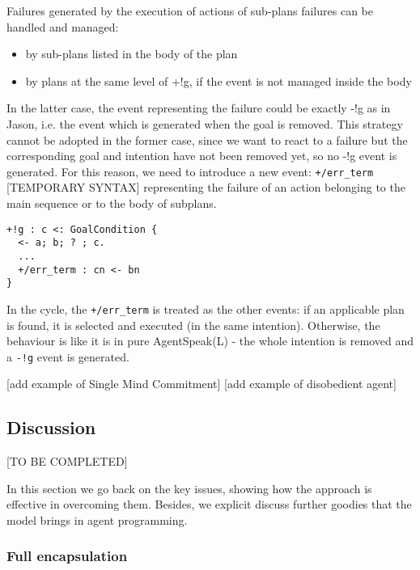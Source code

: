 
Failures generated by the execution of actions of sub-plans failures can be handled and managed:

\begin{itemize}
\item by sub-plans listed in the body of the plan
\item by plans at the same level of +!g, if the event is not managed inside the body
\end{itemize}

\noindent In the latter case, the event representing the failure could be exactly -!g as in Jason, i.e. the event which is generated when the goal is removed.
%
This strategy cannot be adopted in the former case, since we want to react to a failure but the corresponding goal and intention have not been removed yet, so no -!g event is generated. For this reason, we need to introduce a new event:  \texttt{+/err\_term}  [TEMPORARY SYNTAX]  representing the failure of an action belonging to the main sequence or to the body of subplans.  

{\small
\begin{verbatim}
+!g : c <: GoalCondition {
  <- a; b; ? ; c. 
  ...
  +/err_term : cn <- bn
}
\end{verbatim}}

\noindent In the cycle, the \texttt{+/err\_term} is treated as the other events: if an applicable plan is found, it is selected and executed (in the same intention). 
%
Otherwise, the behaviour is like it is in pure AgentSpeak(L) - the whole intention is removed and a \texttt{-!g} event is generated.

[add example of Single Mind Commitment]
[add example of disobedient agent]

\subsection{Discussion}

[TO BE COMPLETED]

In this section we go back on the key issues, showing how the approach is effective in overcoming them.
%
Besides, we explicit discuss further goodies that the model brings in agent programming.

\subsubsection{Full encapsulation}

